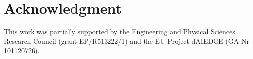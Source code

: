 \documentclass[10pt, conference]{IEEEtran}
\begin{document}
\begin{abstract}




\end{abstract}












\section*{Acknowledgment}

This work was partially supported by the Engineering and Physical Sciences Research Council (grant EP/R513222/1) and the EU Project dAIEDGE (GA Nr 101120726).



\balance



\end{document}
